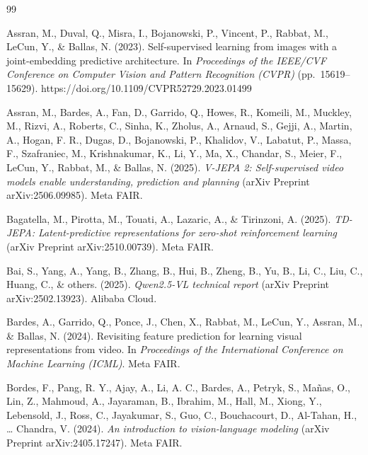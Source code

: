 
\begin{thebibliography}{99}
\setlength{\itemsep}{0.5\baselineskip}

Assran, M., Duval, Q., Misra, I., Bojanowski, P., Vincent, P., Rabbat, M., LeCun, Y., \& Ballas, N. (2023). Self-supervised learning from images with a joint-embedding predictive architecture. In \textit{Proceedings of the IEEE/CVF Conference on Computer Vision and Pattern Recognition (CVPR)} (pp.~15619--15629). https://doi.org/10.1109/CVPR52729.2023.01499

Assran, M., Bardes, A., Fan, D., Garrido, Q., Howes, R., Komeili, M., Muckley, M., Rizvi, A., Roberts, C., Sinha, K., Zholus, A., Arnaud, S., Gejji, A., Martin, A., Hogan, F. R., Dugas, D., Bojanowski, P., Khalidov, V., Labatut, P., Massa, F., Szafraniec, M., Krishnakumar, K., Li, Y., Ma, X., Chandar, S., Meier, F., LeCun, Y., Rabbat, M., \& Ballas, N. (2025). \textit{V-JEPA 2: Self-supervised video models enable understanding, prediction and planning} (arXiv Preprint arXiv:2506.09985). Meta FAIR.

Bagatella, M., Pirotta, M., Touati, A., Lazaric, A., \& Tirinzoni, A. (2025). \textit{TD-JEPA: Latent-predictive representations for zero-shot reinforcement learning} (arXiv Preprint arXiv:2510.00739). Meta FAIR.

Bai, S., Yang, A., Yang, B., Zhang, B., Hui, B., Zheng, B., Yu, B., Li, C., Liu, C., Huang, C., \& others. (2025). \textit{Qwen2.5-VL technical report} (arXiv Preprint arXiv:2502.13923). Alibaba Cloud.

Bardes, A., Garrido, Q., Ponce, J., Chen, X., Rabbat, M., LeCun, Y., Assran, M., \& Ballas, N. (2024). Revisiting feature prediction for learning visual representations from video. In \textit{Proceedings of the International Conference on Machine Learning (ICML)}. Meta FAIR.

Bordes, F., Pang, R. Y., Ajay, A., Li, A. C., Bardes, A., Petryk, S., Mañas, O., Lin, Z., Mahmoud, A., Jayaraman, B., Ibrahim, M., Hall, M., Xiong, Y., Lebensold, J., Ross, C., Jayakumar, S., Guo, C., Bouchacourt, D., Al-Tahan, H., \dots{} Chandra, V. (2024). \textit{An introduction to vision-language modeling} (arXiv Preprint arXiv:2405.17247). Meta FAIR.


\end{thebibliography}
